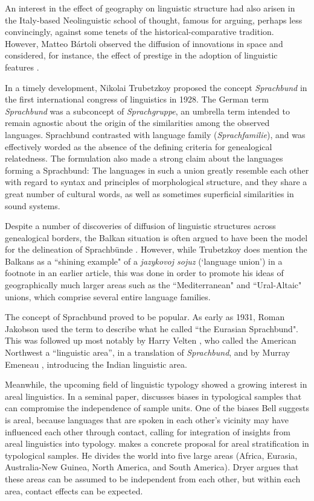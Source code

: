 \documentclass[output=paper,
modfonts
]{langscibook}
\begin{document}
An interest in the effect of geography on linguistic structure had also arisen in the Italy-based Neolinguistic school of thought, famous for arguing, perhaps less convincingly, against some tenets of the historical-comparative tradition. However, Matteo Bártoli observed the diffusion of innovations in space and considered, for instance, the effect of prestige in the adoption of linguistic features \parencite{Hall1946}. 

In a timely development, Nikolai Trubetzkoy \parencite*[18]{trubetzkoy28} proposed the concept \textit{Sprachbund} in the first international congress of linguistics in 1928. The German term \textit{Sprachbund} was a subconcept of \textit{Sprachgruppe}, an umbrella term intended to remain agnostic about the origin of the similarities among the observed languages. Sprachbund contrasted with language family (\textit{Sprachfamilie}), and was effectively worded as the absence of the defining criteria for genealogical relatedness. The formulation also made a strong claim about the languages forming a Sprachbund: The languages in such a union greatly resemble each other with regard to syntax and principles of morphological structure, and they share a great number of cultural words, as well as sometimes superficial similarities in sound systems. 

Despite a number of discoveries of diffusion of linguistic structures across genealogical borders, the Balkan situation is often argued to have been the model for the delineation of Sprachbünde \parencite[see, e.g.,][276]{friedman11}. However, while Trubetzkoy \parencite*{trubetzkoy1923} does mention the Balkans as a ``shining example" of a \textit{jazykovoj sojuz} (`language union') in a footnote in an earlier article, this was done in order to promote his ideas of geographically much larger areas such as the ``Mediterranean" and ``Ural-Altaic" unions, which comprise several entire language families.

The concept of Sprachbund proved to be popular. As early as 1931, Roman Jakobson \parencite*{jakobson31} used the term to describe what he called ``the Eurasian Sprachbund". This was followed up most notably by Harry Velten \parencite*[271]{velten43}, who called the American Northwest a ``linguistic area”, in a translation of \textit{Sprachbund}, and by Murray Emeneau \parencite*{emeneau56}, introducing the Indian linguistic area.

Meanwhile, the upcoming field of linguistic typology showed a growing interest in areal linguistics. 
In a seminal paper, \cite{Bell1978Language} discusses biases in typological samples that can compromise the independence of sample units.
One of the biases Bell suggests is areal, because languages that are spoken in each other's vicinity may have influenced each other through contact, calling for integration of insights from areal linguistics into typology. \cite{Dryer1989Large} makes a concrete proposal for areal stratification in typological samples. He divides the world into five large areas (Africa, Eurasia, Australia-New Guinea, North America, and South America). Dryer argues that these areas can be assumed to be independent from each other, but within each area, contact effects can be expected. 
\end{document}
